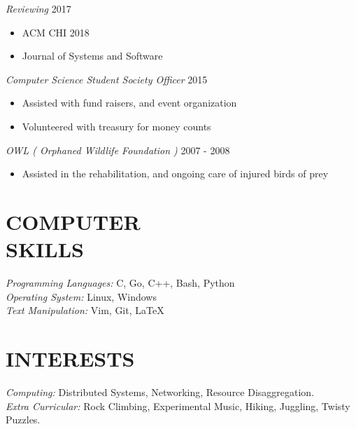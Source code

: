 \documentclass[line,margin]{res}
\begin{document}
\begin{resume}
{{\sl Reviewing} \hfill 2017
    \begin{itemize}
        \item ACM CHI 2018
        \item Journal of Systems and Software
    \end{itemize}

{\sl Computer Science Student Society Officer} \hfill 2015
    \begin{itemize}
        \item Assisted with fund raisers, and event organization
        \item Volunteered with treasury for money counts
    \end{itemize}

{\sl OWL ( Orphaned Wildlife Foundation )} {\hfill 2007 - 2008}
    \begin{itemize}
         \item Assisted in the rehabilitation, and ongoing care of injured birds of prey
    \end{itemize}
}

\section{COMPUTER \\ SKILLS} 
	{\sl Programming Languages:} C, Go, C++, Bash, Python\\
	{\sl Operating System:} Linux, Windows\\
	{\sl Text Manipulation:} Vim, Git, \LaTeX \\

\section{INTERESTS}
	{\sl Computing:}  Distributed Systems, Networking, Resource Disaggregation.\\
	{\sl Extra Curricular:} Rock Climbing, Experimental Music, Hiking, Juggling, Twisty Puzzles.\\

\end{resume}
\end{document}
